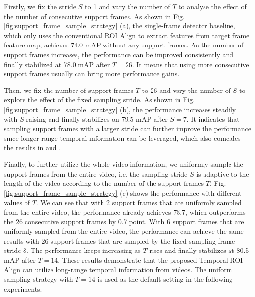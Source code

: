 \documentclass[letterpaper]{article} \usepackage{aaai21}  \usepackage{times}  \usepackage{helvet} \usepackage{courier}  \usepackage[hyphens]{url}  \usepackage{graphicx} \usepackage{hyperref}
\begin{document}
Firstly, we fix the stride $S$ to 1 and vary the number of $T$ to analyse the effect of the number of consecutive support frames. As shown in Fig. \ref{fig:support_frame_sample_strategy} (a), the single-frame detector baseline, which only uses the conventional ROI Align to extract features from target frame feature map, achieves 74.0 mAP without any support frames. As the number of support frames increases, the performance can be improved consistently and finally stabilized at 78.0 mAP after $T=26$. It means that using more consecutive support frames usually can bring more performance gains.


Then, we fix the number of support frames $T$ to 26 and vary the number of $S$ to explore the effect of the fixed sampling stride. As shown in Fig. \ref{fig:support_frame_sample_strategy} (b), the performance increases steadily with $S$ raising and finally stabilizes on 79.5 mAP after $S=7$.
It indicates that sampling support frames with a larger stride can further improve the performance since longer-range temporal information can be leveraged, which also coincides the results in \cite{shvets2019leveraging} and \cite{wu2019sequence}.

Finally, to further utilize the whole video information, we uniformly sample the support frames from the entire video, i.e. the sampling stride $S$ is adaptive to the length of the video according to the number of the support frames $T$. Fig. \ref{fig:support_frame_sample_strategy} (c) shows the performance with different values of $T$.
We can see that with 2 support frames that are uniformly sampled from the entire video, the performance already achieves 78.7, which outperforms the 26 consecutive support frames by 0.7 point. With 6 support frames that are uniformly sampled from the entire video, the performance can achieve the same results with 26 support frames that are sampled by the fixed sampling frame stride 8. The performance keeps increasing as $T$ rises and finally stabilizes at 80.5 mAP after $T=14$.
These results demonstrate that the proposed Temporal ROI Align can utilize long-range temporal information from videos. The uniform sampling strategy with $T=14$ is used as the default setting in the following experiments.
\end{document}
